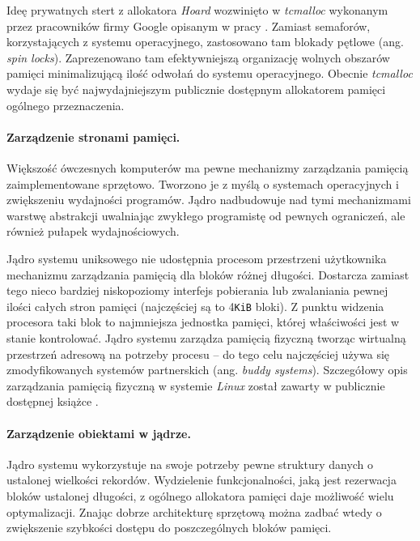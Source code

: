 \documentclass[12pt,a4paper,titlepage,twoside]{mwart}
\begin{document}
Ideę prywatnych stert z allokatora \textit{Hoard} wozwinięto w
\textit{tcmalloc} wykonanym przez pracowników firmy Google opisanym w pracy
\cite{ghemawat07tcmalloc}. Zamiast semaforów, korzystających z systemu
operacyjnego, zastosowano tam blokady pętlowe (ang.  \textit{spin locks}).
Zaprezenowano tam efektywniejszą organizację wolnych obszarów pamięci
minimalizującą ilość odwołań do systemu operacyjnego.  Obecnie
\textit{tcmalloc} wydaje się być najwydajniejszym publicznie dostępnym
allokatorem pamięci ogólnego przeznaczenia.

\paragraph{Zarządzenie stronami pamięci.}

Większość ówczesnych komputerów ma pewne mechanizmy zarządzania pamięcią
zaimplementowane sprzętowo. Tworzono je z myślą o systemach operacyjnych i
zwiększeniu wydajności programów. Jądro nadbudowuje nad tymi mechanizmami
warstwę abstrakcji uwalniając zwykłego programistę od pewnych ograniczeń, ale
również pułapek wydajnościowych.

Jądro systemu uniksowego nie udostępnia procesom przestrzeni użytkownika
mechanizmu zarządzania pamięcią dla bloków różnej długości. Dostarcza zamiast
tego nieco bardziej niskopoziomy interfejs pobierania lub zwalaniania pewnej
ilości całych stron pamięci (najczęściej są to 4\verb+KiB+ bloki). Z punktu
widzenia procesora taki blok to najmniejsza jednostka pamięci, której
właściwości jest w stanie kontrolować. Jądro systemu zarządza pamięcią fizyczną
tworząc wirtualną przestrzeń adresową na potrzeby procesu -- do tego celu
najczęściej używa się zmodyfikowanych systemów partnerskich (ang. \textit{buddy
systems}). Szczegółowy opis zarządzania pamięcią fizyczną w systemie
\textit{Linux} został zawarty w publicznie dostępnej książce
\cite{gorman04linuxvm}.

\paragraph{Zarządzenie obiektami w jądrze.}

Jądro systemu wykorzystuje na swoje potrzeby pewne struktury danych o ustalonej
wielkości rekordów. Wydzielenie funkcjonalności, jaką jest rezerwacja bloków
ustalonej długości, z ogólnego allokatora pamięci daje możliwość wielu
optymalizacji. Znając dobrze architekturę sprzętową można zadbać wtedy o
zwiększenie szybkości dostępu do poszczególnych bloków pamięci.
\end{document}
